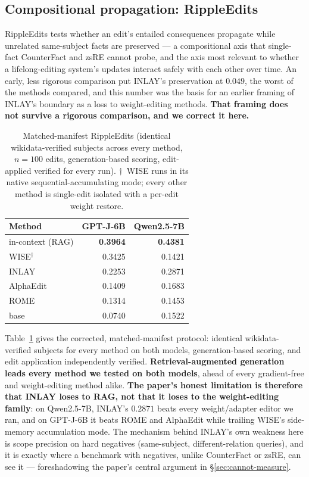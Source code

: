 \documentclass{article}
\begin{document}
\subsection{Compositional propagation: RippleEdits}
\label{sec:ripple}

RippleEdits tests whether an edit's entailed consequences propagate while
unrelated same-subject facts are preserved --- a compositional axis that
single-fact CounterFact and zsRE cannot probe, and the axis most relevant to
whether a lifelong-editing system's updates interact safely with each
other over time. An early, less rigorous comparison put INLAY's preservation
at $0.049$, the worst of the methods compared, and this number was the
basis for an earlier framing of INLAY's boundary as a loss to weight-editing
methods. \textbf{That framing does not survive a rigorous comparison, and we
correct it here.}

\begin{table}[t]
  \centering
  \small
  \begin{tabular}{@{}lrr@{}}
    \toprule
    Method & GPT-J-6B & Qwen2.5-7B \\
    \midrule
    in-context (RAG) & \textbf{0.3964} & \textbf{0.4381} \\
    WISE$^\dagger$   & 0.3425 & 0.1421 \\
    INLAY            & 0.2253 & 0.2871 \\
    AlphaEdit        & 0.1409 & 0.1683 \\
    ROME             & 0.1314 & 0.1453 \\
    base             & 0.0740 & 0.1522 \\
    \bottomrule
  \end{tabular}
  \caption{Matched-manifest RippleEdits (identical wikidata-verified
  subjects across every method, $n{=}100$ edits, generation-based scoring,
  edit-applied verified for every run). $\dagger$~WISE runs in its native
  sequential-accumulating mode; every other method is single-edit isolated
  with a per-edit weight restore.}
  \label{tab:ripple}
\end{table}

Table~\ref{tab:ripple} gives the corrected, matched-manifest protocol:
identical wikidata-verified subjects for every method on both models,
generation-based scoring, and edit application independently verified.
\textbf{Retrieval-augmented generation leads every method we tested on both
models}, ahead of every gradient-free and weight-editing method alike.
\textbf{The paper's honest limitation is therefore that INLAY loses to RAG,
not that it loses to the weight-editing family}: on Qwen2.5-7B, INLAY's
$0.2871$ beats every weight/adapter editor we ran, and on GPT-J-6B it beats
ROME and AlphaEdit while trailing WISE's side-memory accumulation mode. The
mechanism behind INLAY's own weakness here is scope precision on hard
negatives (same-subject, different-relation queries), and it is exactly
where a benchmark with negatives, unlike CounterFact or zsRE, can see it ---
foreshadowing the paper's central argument in \S\ref{sec:cannot-measure}.
\end{document}
